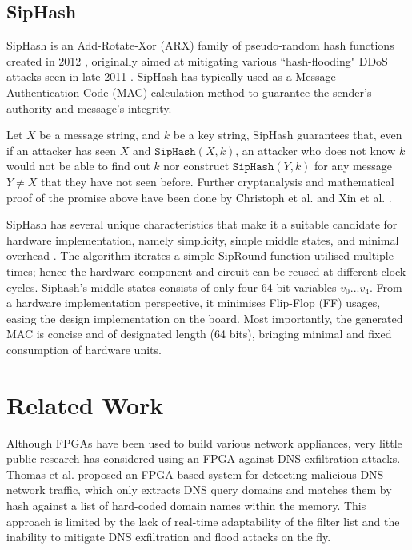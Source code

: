 \documentclass[a4paper]{report}
\newcommand{\code}{\texttt}
\begin{document}
\subsection{SipHash}
\label{section:background-siphash}

SipHash is an Add-Rotate-Xor (ARX) family of pseudo-random hash functions created in 2012 \cite{aumasson-bernstein-2012}, originally aimed at mitigating various ``hash-flooding" DDoS attacks seen in late 2011 \cite{lennon-2011}. SipHash has typically used as a Message Authentication Code (MAC) calculation method to guarantee the sender's authority and message's integrity. 

Let $X$ be a message string, and $k$ be a key string, SipHash guarantees that, even if an attacker has seen $X$ and $\code{SipHash}(X, k)$, an attacker who does not know $k$ would not be able to find out $k$ nor construct $\code{SipHash}(Y, k)$ for any message $Y \neq X$ that they have not seen before. Further cryptanalysis and mathematical proof of the promise above have been done by Christoph et al. \cite{dobraunig-2014} and Xin et al. \cite{xin-2019}.

SipHash has several unique characteristics that make it a suitable candidate for hardware implementation, namely simplicity, simple middle states, and minimal overhead \cite{aumasson-bernstein-2012}. The algorithm iterates a simple SipRound function utilised multiple times; hence the hardware component and circuit can be reused at different clock cycles. Siphash's middle states consists of only four 64-bit variables $v_0 ... v_4$. From a hardware implementation perspective, it minimises Flip-Flop (FF) usages, easing the design implementation on the board. Most importantly, the generated MAC is concise and of designated length (64 bits), bringing minimal and fixed consumption of hardware units.

\section{Related Work}

Although FPGAs have been used to build various network appliances, very little public research has considered using an FPGA against DNS exfiltration attacks. Thomas et al. \cite{thomas-2011} proposed an FPGA-based system for detecting malicious DNS network traffic, which only extracts DNS query domains and matches them by hash against a list of hard-coded domain names within the memory. This approach is limited by the lack of real-time adaptability of the filter list and the inability to mitigate DNS exfiltration and flood attacks on the fly. 
\end{document}
